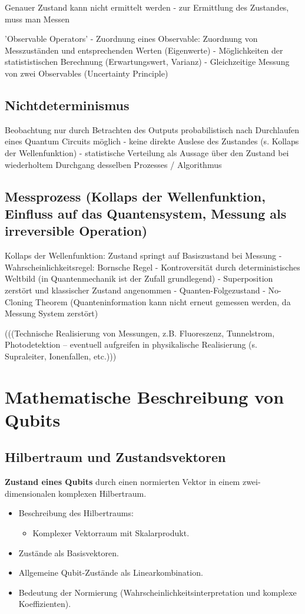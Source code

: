 Genauer Zustand kann nicht ermittelt werden - zur Ermittlung des Zustandes, muss man Messen

'Observable Operators'
- Zuordnung eines Observable: Zuordnung von Messzuständen und entsprechenden Werten (Eigenwerte)
- Möglichkeiten der statististischen Berechnung (Erwartungswert, Varianz)
- Gleichzeitige Messung von zwei Observables (Uncertainty Principle)

\subsection{Nichtdeterminismus}
Beobachtung nur durch Betrachten des Outputs probabilistisch nach Durchlaufen eines Quantum Circuits möglich
- keine direkte Auslese des Zustandes (s. Kollaps  der Wellenfunktion)
- statistische Verteilung als Aussage über den Zustand bei wiederholtem Durchgang desselben Prozesses / Algorithmus

\subsection{Messprozess (Kollaps der Wellenfunktion, Einfluss auf das Quantensystem, Messung als irreversible Operation) }
Kollaps der Wellenfunktion: Zustand springt auf Basiszustand bei Messung
- Wahrscheinlichkeitsregel: Bornsche Regel
- Kontroversität durch deterministisches Weltbild (in Quantenmechanik ist der Zufall grundlegend) 
- Superposition zerstört und klassischer Zustand angenommen 
- Quanten-Folgezustand 
- No-Cloning Theorem (Quanteninformation kann nicht erneut gemessen werden, da Messung System zerstört) 


(((Technische Realisierung von Messungen, z.B. Fluoreszenz, Tunnelstrom, Photodetektion – eventuell aufgreifen in physikalische Realisierung (s. Supraleiter, Ionenfallen, etc.))) 


\section{Mathematische Beschreibung von Qubits}

\subsection{Hilbertraum und Zustandsvektoren}
\textbf{Zustand eines Qubits} durch einen normierten Vektor in einem zwei-dimensionalen komplexen Hilbertraum.
\begin{itemize}
    \item Beschreibung des Hilbertraums:
    \begin{itemize}
        \item Komplexer Vektorraum mit Skalarprodukt.
    \end{itemize}
    \item Zustände als Basisvektoren.
    \item Allgemeine Qubit-Zustände als Linearkombination.
    \item Bedeutung der Normierung (Wahrscheinlichkeitsinterpretation und komplexe Koeffizienten).
\end{itemize}

